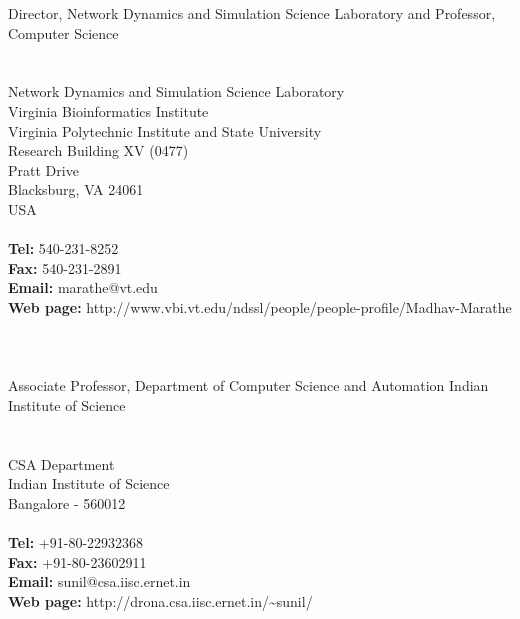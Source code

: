 \documentclass[10pt]{article} %
\begin{document}
\begin{resume}
{\noindent Director, Network Dynamics and Simulation Science Laboratory
and Professor, Computer Science\\
\\
 \\
\noindent Network Dynamics and Simulation Science Laboratory \\
\noindent Virginia Bioinformatics Institute \\
\noindent Virginia Polytechnic Institute and State University \\
\noindent Research Building XV (0477) \\
 Pratt Drive \\
\noindent Blacksburg, VA 24061 \\
\noindent USA \\
\\
{\bf Tel:} 540-231-8252\\
{\bf Fax:} 540-231-2891\\
{\bf Email:} marathe@vt.edu\\
{\bf Web page:}
http://www.vbi.vt.edu/ndssl/people/people-profile/Madhav-Marathe \\
\\
\\
\\
Associate Professor,
Department of Computer Science and Automation
Indian Institute of Science\\
\\
 \\
CSA Department\\
Indian Institute of Science\\
Bangalore - 560012\\
\\
{\bf Tel:} +91-80-22932368\\
{\bf Fax:} +91-80-23602911 \\
{\bf Email:} sunil@csa.iisc.ernet.in\\
{\bf Web page:} http://drona.csa.iisc.ernet.in/\textasciitilde sunil/


   }{}
\end{resume}

\end{document}
